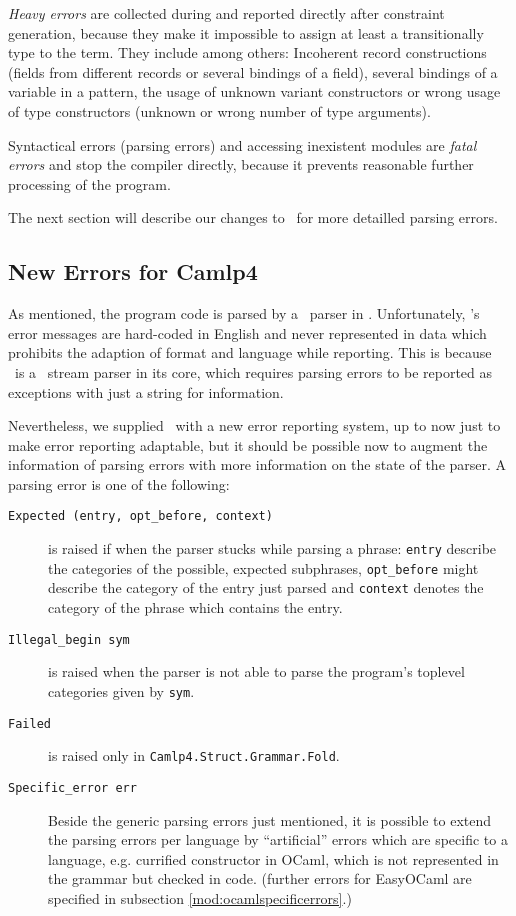 \emph{Heavy errors} are collected during and reported directly after constraint
generation, because they make it impossible to assign at least a transitionally
type to the term. They include among others:
Incoherent record constructions (fields from different records or several
bindings of a field), several bindings of a variable in a pattern, the usage of
unknown variant constructors or wrong usage of type constructors (unknown or
wrong number of type arguments).

Syntactical errors (parsing errors) and accessing inexistent modules are
\emph{fatal errors} and stop the compiler directly, because it prevents
reasonable further processing of the program.

The next section will describe our changes to \camlpf\ for more detailled
parsing errors.

\subsection{New Errors for Camlp4}

As mentioned, the program code is parsed by a \camlpf\ parser in  \easyocaml.
Unfortunately, \camlpf's error messages are hard-coded in English and never
represented in data which prohibits the adaption of format and language while
reporting.  This is because \camlpf\ is a \ocaml\ stream parser in its core,
which requires parsing errors to be reported as exceptions with just a string
for information.

Nevertheless, we supplied \camlpf\ with a new error reporting system, up 
to now just to make error reporting adaptable, but it should be possible 
now to augment the information of parsing errors with more information on the
state of the parser. A parsing error is one of
the following:

\begin{description}
    \item[\texttt{Expected~(entry,~opt\_before,~context)}] is raised 
        if when the parser stucks while parsing a phrase: \texttt{entry} 
        describe the categories of the possible, expected subphrases, 
        \texttt{opt\_before} might describe the category of the entry 
        just parsed and \texttt{context} denotes the category of the 
        phrase which contains the entry.
    \item[\texttt{Illegal\_begin~sym}] is raised when the parser is 
        not able to parse the program's toplevel categories given by
        \texttt{sym}.
    \item[\texttt{Failed}] is raised only in 
        \texttt{Camlp4.Struct.Grammar.Fold}.
    \item[\texttt{Specific\_error~err}] Beside the generic parsing 
        errors just mentioned, it is possible to extend the parsing 
        errors per language by ``artificial'' errors which are specific 
        to a language, e.g. currified constructor in OCaml, which is not
        represented in the grammar but checked in code.  (further errors for
        EasyOCaml are specified in subsection \ref{mod:ocamlspecificerrors}.)
\end{description}

